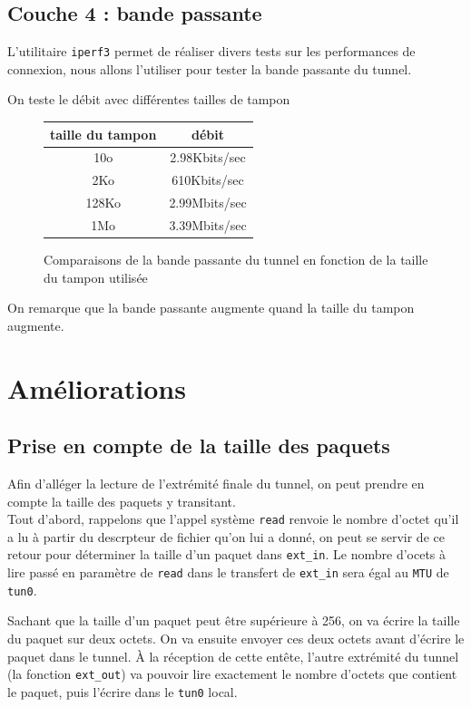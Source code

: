 \documentclass[a4paper, 10pt]{article}
\begin{document}
    \subsection{Couche 4 : bande passante}
      L'utilitaire \verb+iperf3+ permet de réaliser divers tests sur les
      performances de connexion, nous allons l'utiliser pour tester la bande
      passante du tunnel.

      On teste le débit avec différentes tailles de tampon

      \begin{figure}[h]
        \centering
        \begin{tabular}{|c|c|}
          \hline
          taille du tampon & débit \\
          \hline
          10o & 2.98Kbits/sec \\
          2Ko & 610Kbits/sec \\
          128Ko & 2.99Mbits/sec \\
          1Mo & 3.39Mbits/sec \\
          \hline
        \end{tabular}
        \caption{Comparaisons de la bande passante du tunnel en fonction de la
        taille du tampon utilisée}
      \end{figure}

      On remarque que la bande passante augmente quand la taille du tampon
      augmente.

  \section{Améliorations}
    \subsection{Prise en compte de la taille des paquets}
      Afin d'alléger la lecture de l'extrémité finale du tunnel, on peut prendre
      en compte la taille des paquets y transitant. \\

      Tout d'abord, rappelons que l'appel système \verb+read+ renvoie le nombre
      d'octet qu'il a lu à partir du descrpteur de fichier qu'on lui a donné, on
      peut se servir de ce retour pour déterminer la taille d'un paquet dans
      \verb+ext_in+. Le nombre d'ocets à lire passé en paramètre de \verb+read+
      dans le transfert de \verb+ext_in+ sera égal au \verb+MTU+ de \verb+tun0+.

      Sachant que la taille d'un paquet peut être supérieure à 256, on va écrire
      la taille du paquet sur deux octets. On va ensuite envoyer ces deux octets
      avant d'écrire le paquet dans le tunnel. À la réception de cette entête,
      l'autre extrémité du tunnel (la fonction \verb+ext_out+) va pouvoir lire
      exactement le nombre d'octets que contient le paquet, puis l'écrire dans
      le \verb+tun0+ local. \\
\end{document}
